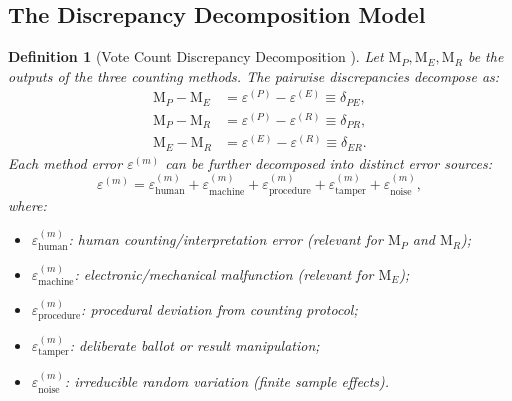 \documentclass[11pt,a4paper]{article}
\newtheorem{definition}[theorem]{Definition}
\theoremstyle{definition}
\newcommand{\method}[1]{\mathrm{M}_{#1}}
\begin{document}
\subsection{The Discrepancy Decomposition Model}
\begin{definition}[Vote Count Discrepancy Decomposition ]
\label{def:discrepancy_decomp}
Let $\method{P}, \method{E}, \method{R}$ be the outputs of the three counting methods. The pairwise discrepancies decompose as:
\begin{align}
    \method{P} - \method{E} &= \varepsilon^{(P)} - \varepsilon^{(E)} \equiv \delta_{PE}, \\
    \method{P} - \method{R} &= \varepsilon^{(P)} - \varepsilon^{(R)} \equiv \delta_{PR}, \\
    \method{E} - \method{R} &= \varepsilon^{(E)} - \varepsilon^{(R)} \equiv \delta_{ER}.
    \label{eq:pairwise_discrepancies}
\end{align}
Each method error $\varepsilon^{(m)}$ can be further decomposed into distinct error sources:
\begin{equation}
    \varepsilon^{(m)} = \varepsilon^{(m)}_{\text{human}} + \varepsilon^{(m)}_{\text{machine}} + \varepsilon^{(m)}_{\text{procedure}} + \varepsilon^{(m)}_{\text{tamper}} + \varepsilon^{(m)}_{\text{noise}},
    \label{eq:error_decomposition}
\end{equation}
where:
\begin{itemize}
    \item $\varepsilon^{(m)}_{\text{human}}$: human counting/interpretation error (relevant for $\method{P}$ and $\method{R}$);
    \item $\varepsilon^{(m)}_{\text{machine}}$: electronic/mechanical malfunction (relevant for $\method{E}$);
    \item $\varepsilon^{(m)}_{\text{procedure}}$: procedural deviation from counting protocol;
    \item $\varepsilon^{(m)}_{\text{tamper}}$: deliberate ballot or result manipulation;
    \item $\varepsilon^{(m)}_{\text{noise}}$: irreducible random variation (finite sample effects).
\end{itemize}
\end{definition}
\end{document}
